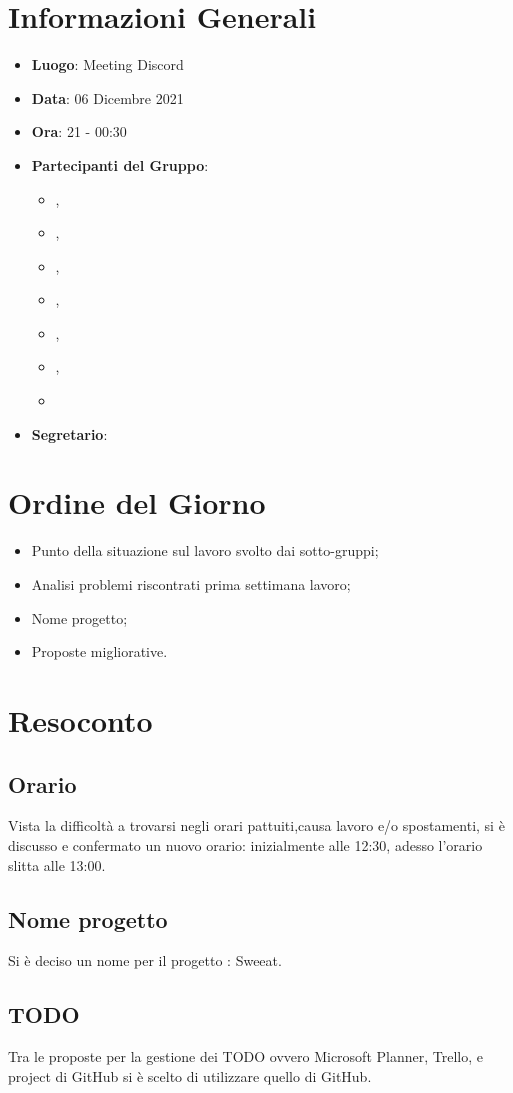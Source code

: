 \section{Informazioni Generali}

\begin{itemize}
\item{\textbf{Luogo}}: Meeting Discord
\item{\textbf{Data}}: 06 Dicembre 2021
\item{\textbf{Ora}}: 21 - 00:30
\item{\textbf{Partecipanti del Gruppo}}: 
	\begin{itemize}
	\item{\EP{},} 
	\item{\FP{},}
	\item{\GC{},}
	\item{\LW{},}
	\item{\MB{},}
	\item{\MG{},}
	\item{\PV{}}
	\end{itemize} 
\item{\textbf{Segretario}}: \PV{}	
\end{itemize}

\section{Ordine del Giorno}
\begin{itemize}
\item{Punto della situazione sul lavoro svolto dai sotto-gruppi;}
\item{Analisi problemi riscontrati prima settimana lavoro;}
\item{Nome progetto;}
\item{Proposte migliorative.}
\end{itemize}

\section{Resoconto}

\subsection{Orario}
Vista la difficoltà a trovarsi negli orari pattuiti,causa lavoro e/o spostamenti, si è discusso e confermato un nuovo orario: inizialmente alle 12:30, adesso l'orario slitta alle 13:00.


\subsection{Nome progetto}
Si è deciso un nome per il progetto : Sweeat.


\subsection{TODO}
Tra le proposte per la gestione dei TODO ovvero Microsoft Planner, Trello, e project di GitHub si è scelto di utilizzare quello di GitHub.